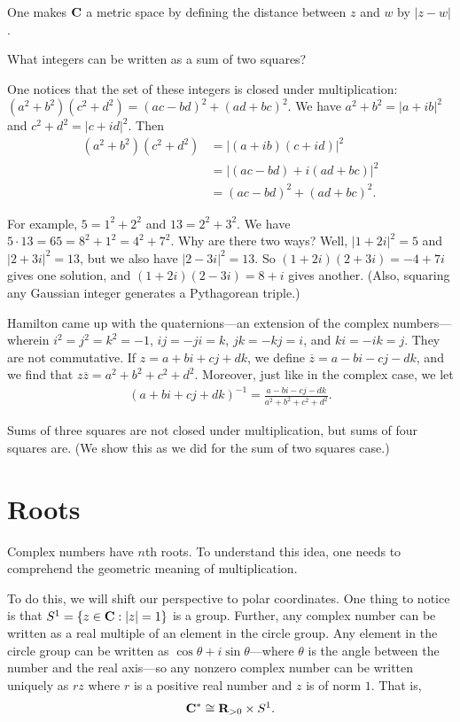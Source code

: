 \documentclass[11pt, oneside,margin=1in]{article}
\begin{document}
One makes $\mathbf C$ a metric space by defining the distance between $z$ and $w$ by $\left\lvert z-w \right\rvert $.

\begin{problem}
	What integers can be written as a sum of two squares?
\end{problem}

One notices that the set of these integers is closed under multiplication: $(a^2+b^2) (c^2+d^2) =  (ac-bd) ^2 + (ad+bc) ^2$. We have $a^2 + b^2 = \left\lvert a+ib \right\rvert ^2$ and $c^2 + d^2 = \left\lvert c+id \right\rvert ^2$. Then 
\begin{align*}
	(a^2+b^2) (c^2+d^2)&=  \left\lvert (a+ib) (c+id) \right\rvert ^2\\
			   &= \left\lvert (ac-bd) + i (ad+bc) \right\rvert^2\\
			   &= (ac-bd) ^2 + (ad+bc)^2.
\end{align*}

For example, $5=1^2 + 2^2$ and $13 = 2^2 + 3^2$. We have $5\cdot 13 = 65 = 8^2 + 1^2 = 4^2 + 7^2$. Why are there two ways? Well, $\left\lvert 1+2i \right\rvert ^2 = 5$ and $\left\lvert 2+3i \right\rvert ^2 = 13$, but we also have $\left\lvert 2-3i \right\rvert ^2 = 13$. So $(1+2i) (2+3i) = -4 + 7i$ gives one solution, and $(1+2i) (2-3i) = 8+i$ gives another. (Also, squaring any Gaussian integer generates a Pythagorean triple.)

Hamilton came up with the quaternions---an extension of the complex numbers---wherein $i^2 = j^2 = k^2 = -1$, $ij = -ji = k$, $jk = -kj = i$, and $ki = -ik = j$. They are not commutative. If $z = a+bi+cj+dk$, we define $\overline{z}=a-bi-cj-dk$, and we find that $z\overline{z}=a^2 + b^2+c^2+d^2$. Moreover, just like in the complex case, we let
\begin{align*}
	(a+bi+cj+dk) ^{-1} = \frac{a-bi-cj-dk}{a^2+b^2+c^2+d^2}.
\end{align*}

Sums of three squares are not closed under multiplication, but sums of four squares are. (We show this as we did for the sum of two squares case.)
\iffalse\section{Roots}
Complex numbers have $n$th roots. To understand this idea, one needs to comprehend the geometric meaning of multiplication.

To do this, we will shift our perspective to polar coordinates. One thing to notice is that $S^1 = \{z\in \mathbf C:\left\lvert z \right\rvert =1\}$ is a group. Further, any complex number can be written as a real multiple of an element in the circle group. Any element in the circle group can be written as $\cos\theta + i\sin\theta$---where $\theta$ is the angle between the number and the real axis---so any nonzero complex number can be written uniquely as $rz$ where $r$ is a positive real number and $z$ is of norm $1$. That is,
\begin{align*}
	\mathbf C^* \cong \mathbf R_{>0} \times S^1.
\end{align*}
\end{document}
